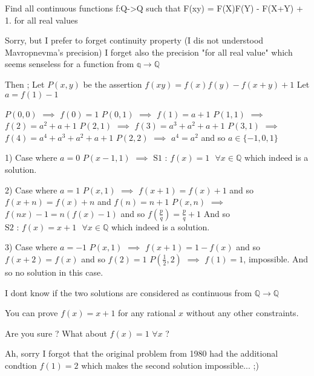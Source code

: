 \begin{solution}
	\begin{tcolorbox}Find all continuous functions f:Q->Q such that F(xy) = F(X)F(Y) - F(X+Y) + 1. for all real values\end{tcolorbox}
Sorry, but I prefer to forget continuity property (I dis not understood Mavropnevma's precision)
I forget also the precision "for all real value" which seems senseless for a function from $\mathbb q\to\mathbb Q$

Then ;
Let $P(x,y)$ be the assertion $f(xy)=f(x)f(y)-f(x+y)+1$
Let $a=f(1)-1$

$P(0,0)$ $\implies$ $f(0)=1$
$P(0,1)$ $\implies$ $f(1)=a+1$
$P(1,1)$ $\implies$ $f(2)=a^2+a+1$
$P(2,1)$ $\implies$ $f(3)=a^3+a^2+a+1$
$P(3,1)$ $\implies$ $f(4)=a^4+a^3+a^2+a+1$
$P(2,2)$ $\implies$ $a^4=a^2$ and so $a\in\{-1,0,1\}$

1) Case where $a=0$
$P(x-1,1)$ $\implies$ $\boxed{\text{S1 : }f(x)=1\text{  }\forall x\in\mathbb Q}$ which indeed is a solution.

2) Case where $a=1$
$P(x,1)$ $\implies$ $f(x+1)=f(x)+1$ and so $f(x+n)=f(x)+n$ and $f(n)=n+1$
$P(x,n)$ $\implies$ $f(nx)-1=n(f(x)-1)$ and so $f(\frac pq)=\frac pq+1$
And so $\boxed{\text{S2 : }f(x)=x+1\text{  }\forall x\in\mathbb Q}$ which indeed is a solution.

3) Case where $a=-1$
$P(x,1)$ $\implies$ $f(x+1)=1-f(x)$ and so $f(x+2)=f(x)$ and so $f(2)=1$
$P(\frac 12,2)$ $\implies$ $f(1)=1$, impossible. And so no solution in this case.

I dont know if the two solutions are considered as continuous from $\mathbb Q\to\mathbb Q$
\end{solution}



\begin{solution}
	\begin{tcolorbox}You can prove $f(x)=x+1$ for any rational $x$ without any other constraints.\end{tcolorbox}
Are you sure ?
What about $f(x)=1$ $\forall x$ ?
\end{solution}



\begin{solution}
	Ah, sorry I forgot that the original problem from 1980 had the additional condtion $f(1)=2$ which makes the second solution impossible... ;)
\end{solution}



